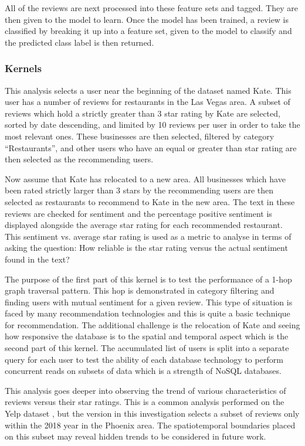 All of the reviews are next processed into these feature sets and tagged. They are then given to the model to learn. Once the model has been trained, a review is classified by breaking it up into a feature set, given to the model to classify and the predicted class label is then returned.

\subsubsection{Kernels}
\label{sec:kernels}

This analysis selects a user near the beginning of the dataset named Kate. This user has a number of reviews for restaurants in the Las Vegas area. A subset of reviews which hold a strictly greater than 3 star rating by Kate are selected, sorted by date descending, and limited by 10 reviews per user in order to take the most relevant ones. These businesses are then selected, filtered by category ``Restaurants'', and other users who have an equal or greater than star rating are then selected as the recommending users.

Now assume that Kate has relocated to a new area. All businesses which have been rated strictly larger than 3 stars by the recommending users are then selected as restaurants to recommend to Kate in the new area. The text in these reviews are checked for sentiment and the percentage positive sentiment is displayed alongside the average star rating for each recommended restaurant. This sentiment vs. average star rating is used as a metric to analyse in terms of asking the question: How reliable is the star rating versus the actual sentiment found in the text?

The purpose of the first part of this kernel is to test the performance of a 1-hop graph traversal pattern. This hop is demonstrated in category filtering and finding users with mutual sentiment for a given review. This type of situation is faced by many recommendation technologies and this is quite a basic technique for recommendation. The additional challenge is the relocation of Kate and seeing how responsive the database is to the spatial and temporal aspect which is the second part of this kernel. The accumulated list of users is split into a separate query for each user to test the ability of each database technology to perform concurrent reads on subsets of data which is a strength of NoSQL databases.

This analysis goes deeper into observing the trend of various characteristics of reviews versus their star ratings. This is a common analysis performed on the Yelp dataset \cite{yelp-trends-zhang}, but the version in this investigation selects a subset of reviews only within the 2018 year in the Phoenix area. The spatiotemporal boundaries placed on this subset may reveal hidden trends to be considered in future work.

